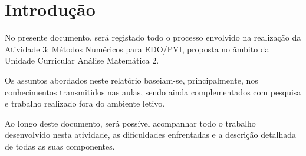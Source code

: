 
\chapter{Introdução}


No presente documento, será registado todo o processo envolvido na realização da Atividade 3: Métodos Numéricos para EDO/PVI, proposta no âmbito da Unidade Curricular Análise Matemática 2.

Os assuntos abordados neste relatório baseiam-se, principalmente, nos conhecimentos transmitidos nas aulas, sendo ainda complementados com pesquisa e trabalho realizado fora do ambiente letivo.

Ao longo deste documento, será possível acompanhar todo o trabalho desenvolvido nesta atividade, as dificuldades enfrentadas e a descrição detalhada de todas as suas componentes.

